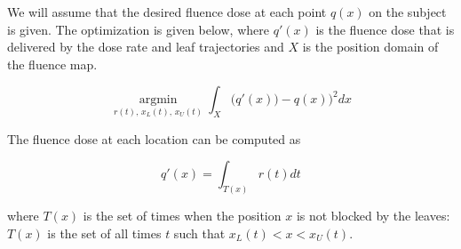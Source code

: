 
We will assume that the desired fluence dose at each point $q(x)$ on the subject is given.
The optimization is given below, where $q'(x)$ is the fluence dose that is delivered by the
dose rate and leaf trajectories and $X$ is the position domain of the fluence map.

\begin{equation}
\underset{r(t), \, x_L(t), \, x_U(t)}{\operatorname{argmin}}
\int_X \bigg(q'(x)) - q(x)\bigg)^2 dx
\label{eqn:fluenceMapOptimization}
\end{equation}

The fluence dose at each location can be computed as

\begin{equation}
q'(x) = \int_{T(x)} r(t) dt
\label{eqn:deliveredFluenceDose}
\end{equation}

where $T(x)$ is the set of times when the position $x$ is not blocked by the leaves:
$T(x)$ is the set of all times $t$ such that $ x_L(t) < x < x_U(t)$.



